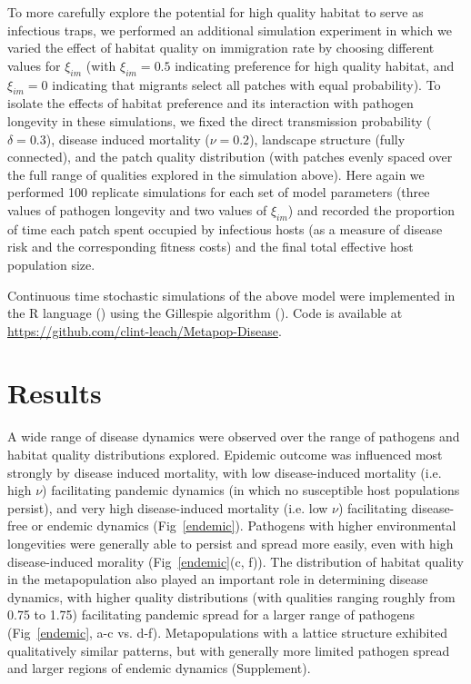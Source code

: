 \documentclass{article}
\begin{document}
To more carefully explore the potential for high quality habitat to serve as infectious traps, we performed an additional simulation experiment in which we varied the effect of habitat quality on immigration rate by choosing different values for $\xi_{im}$ (with $\xi_{im} = 0.5$ indicating preference for high quality habitat, and  $\xi_{im} = 0$ indicating that migrants select all patches with equal probability).  To isolate the effects of habitat preference and its interaction with pathogen longevity in these simulations, we fixed the direct transmission probability ($\delta = 0.3$), disease induced mortality ($\nu = 0.2$), landscape structure (fully connected), and the patch quality distribution (with patches evenly spaced over the full range of qualities explored in the simulation above).  Here again we performed 100 replicate simulations for each set of model parameters (three values of pathogen longevity and two values of $\xi_{im}$) and recorded the proportion of time each patch spent occupied by infectious hosts (as a measure of disease risk and the corresponding fitness costs) and the final total effective host population size.

Continuous time stochastic simulations of the above model were implemented in the R language (\cite{R2014}) using the Gillespie algorithm (\cite{Gillespie1977}).  Code is available at \url{https://github.com/clint-leach/Metapop-Disease}.

\section{Results}
\label{results}

A wide range of disease dynamics were observed over the range of pathogens and habitat quality distributions explored.  
Epidemic outcome was influenced most strongly by disease induced mortality, with low disease-induced mortality (i.e. high $\nu$) facilitating pandemic dynamics (in which no susceptible host populations persist), and very high disease-induced mortality (i.e. low $\nu$) facilitating disease-free or endemic dynamics (Fig~\ref{endemic}). 
Pathogens with higher environmental longevities were generally able to persist and spread more easily, even with high disease-induced morality (Fig~\ref{endemic}(c, f)).  
The distribution of habitat quality in the metapopulation also played an important role in determining disease dynamics, with higher quality distributions (with qualities ranging roughly from 0.75 to 1.75) facilitating pandemic spread for a larger range of pathogens (Fig~\ref{endemic}, a-c vs. d-f).
Metapopulations with a lattice structure exhibited qualitatively similar patterns, but with generally more limited pathogen spread and larger regions of endemic dynamics (Supplement).
\end{document}

